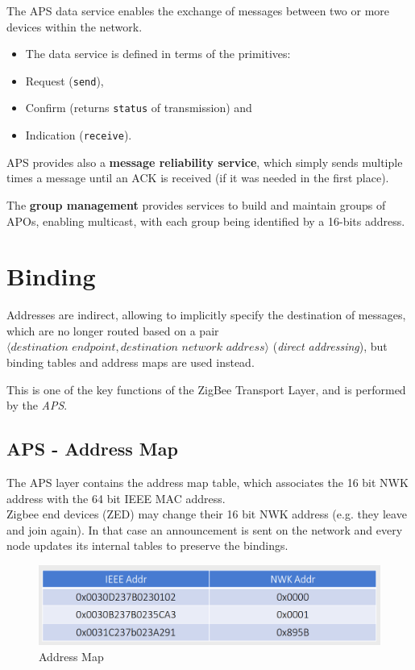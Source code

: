The APS data service enables the exchange of messages between two or more devices within the network.
\begin{itemize}
   \item The data service is defined in terms of the primitives:
   \item Request (\texttt{send}),
   \item Confirm (returns \texttt{status} of transmission) and
   \item Indication (\texttt{receive}).
\end{itemize}

APS provides also a \textbf{message reliability service}, which simply sends multiple times a message until an ACK is received (if it was needed in the first place).

The \textbf{group management} provides services to build and maintain groups of APOs, enabling multicast, with each group being identified by a 16-bits address.




\section{Binding}
Addresses are indirect, allowing to implicitly specify the destination of messages, which are no longer routed based on a pair $\langle \textit{destination endpoint}, \textit{destination network address} \rangle$ (\textit{direct addressing}), but binding tables and address maps are used instead.

This is one of the key functions of the ZigBee Transport Layer, and is performed by the \textit{APS}.

\subsection{APS - Address Map}
The APS layer contains the address map table, which associates the 16 bit NWK address with the 64 bit IEEE
MAC address.\\
Zigbee end devices (ZED) may change their 16 bit NWK
address (e.g. they leave and join again). In that case an
announcement is sent on the network and every node
updates its internal tables to preserve the bindings.
\begin{figure}[htbp]
   \centering
   \includegraphics{images/zigbee_addressmap.png}
   \caption{Address Map}
   \label{fig:zigbee_addressmap}
\end{figure}

